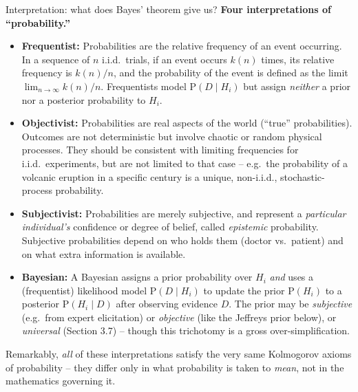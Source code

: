 \documentclass[aspectratio=169,10pt]{beamer}
\begin{document}
\begin{frame}[allowframebreaks]{Interpretation: what does Bayes' theorem give us?}
  \textbf{Four interpretations of ``probability.''}
  \begin{itemize}
    \item \textbf{Frequentist:} Probabilities are the relative frequency of
      an event occurring. In a sequence of $n$ i.i.d.\ trials, if an event
      occurs $k(n)$ times, its relative frequency is $k(n)/n$, and the
      probability of the event is defined as the limit
      $\lim_{n\to\infty}k(n)/n$. Frequentists model $\mathrm P(D\mid H_i)$
      but assign \emph{neither} a prior nor a posterior probability to
      $H_i$.
    \item \textbf{Objectivist:} Probabilities are real aspects of the world
      (``true'' probabilities). Outcomes are not deterministic but involve
      chaotic or random physical processes. They should be consistent with
      limiting frequencies for i.i.d.\ experiments, but are not limited to
      that case -- e.g.\ the probability of a volcanic eruption in a specific
      century is a unique, non-i.i.d., stochastic-process probability.
    \item \textbf{Subjectivist:} Probabilities are merely subjective, and
      represent a \emph{particular individual's} confidence or degree of
      belief, called \emph{epistemic} probability. Subjective probabilities
      depend on who holds them (doctor vs.\ patient) and on what extra
      information is available.
    \item \textbf{Bayesian:} A Bayesian assigns a prior probability over
      $H_i$ \emph{and} uses a (frequentist) likelihood model
      $\mathrm P(D\mid H_i)$ to update the prior $\mathrm P(H_i)$ to a
      posterior $\mathrm P(H_i\mid D)$ after observing evidence $D$. The
      prior may be \emph{subjective} (e.g.\ from expert elicitation) or
      \emph{objective} (like the Jeffreys prior below), or \emph{universal}
      (Section 3.7) -- though this trichotomy is a gross over-simplification.
  \end{itemize}

  Remarkably, \emph{all} of these interpretations satisfy the very same
  Kolmogorov axioms of probability -- they differ only in what probability
  is taken to \emph{mean}, not in the mathematics governing it.
\end{frame}
\end{document}
